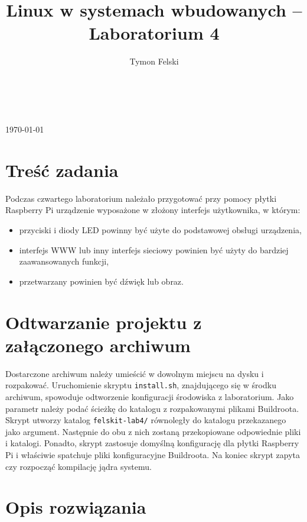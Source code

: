 \documentclass[10pt,a4paper]{article}
\title{Linux w systemach wbudowanych -- Laboratorium 4}
\author{Tymon Felski}
\begin{document}
\makeatletter
\begin{center}
	\LARGE{\@title}\\
	\vspace{.4cm}
	\Large{\@author}\\
	\vspace{.2cm}
	\large{\today}
\end{center}
\makeatother

\section{Treść zadania}
Podczas czwartego laboratorium należało przygotować przy pomocy płytki Raspberry Pi urządzenie wyposażone w złożony interfejs użytkownika, w którym:
\begin{itemize}
	\item przyciski i diody LED powinny być użyte do podstawowej obsługi urządzenia,
	\item interfejs WWW lub inny interfejs sieciowy powinien być użyty do bardziej zaawansowanych funkcji,
	\item przetwarzany powinien być dźwięk lub obraz.
\end{itemize}

\section{Odtwarzanie projektu z załączonego archiwum}
Dostarczone archiwum należy umieścić w dowolnym miejscu na dysku i rozpakować. Uruchomienie skryptu \texttt{install.sh}, znajdującego się w środku archiwum, spowoduje odtworzenie konfiguracji środowiska z laboratorium. Jako parametr należy podać ścieżkę do katalogu z rozpakowanymi plikami Buildroota.\\[\baselineskip]
Skrypt utworzy katalog \texttt{felskit-lab4/} równoległy do katalogu przekazanego jako argument. Następnie do obu z nich zostaną przekopiowane odpowiednie pliki i katalogi. Ponadto, skrypt zastosuje domyślną konfigurację dla płytki Raspberry Pi i właściwie spatchuje pliki konfiguracyjne Buildroota. Na koniec skrypt zapyta czy rozpocząć kompilację jądra systemu.

\section{Opis rozwiązania}
\end{document}

